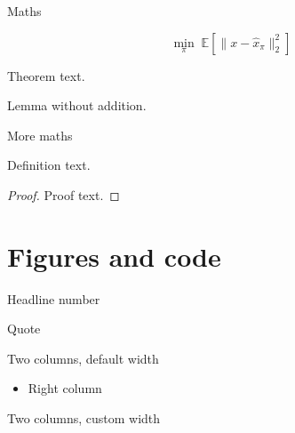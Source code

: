 \documentclass[aspectratio=169,10pt]{beamer}
\begin{document}
\begin{frame}{Maths}
  \begin{keyeq}
    \begin{equation}
      \min_{\pi}\; \mathbb{E}\!\left[\lVert x - \hat{x}_{\pi}\rVert_2^2\right]
    \end{equation}
  \end{keyeq}
  \begin{theorem}Theorem text.\end{theorem}
  \begin{lemma}Lemma without addition.\end{lemma}
\end{frame}

\begin{frame}{More maths}
  \begin{definition}Definition text.\end{definition}
  \begin{proof}Proof text.\end{proof}
\end{frame}

\thbagenda
{}

\section{Figures and code}

\begin{frame}{Headline number}
\end{frame}

\begin{frame}{Quote}
\end{frame}

\begin{frame}{Two columns, default width}
  \begin{twocols}
    \colbreak
    \begin{itemize}\item Right column\end{itemize}
  \end{twocols}
\end{frame}

\begin{frame}{Two columns, custom width}
  \begin{twocols}[0.4]
    \colbreak
  \end{twocols}
\end{frame}
\end{document}
